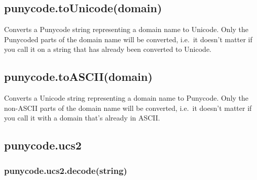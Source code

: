\subsection{punycode.toUnicode(domain)}\label{punycode.tounicodedomain}

Converts a Punycode string representing a domain name to Unicode. Only
the Punycoded parts of the domain name will be converted, i.e.~it
doesn't matter if you call it on a string that has already been
converted to Unicode.

\begin{Shaded}
\begin{Highlighting}[]
\NormalTok{(}\NormalTok{); }
\NormalTok{(}\NormalTok{); }
\end{Highlighting}
\end{Shaded}

\subsection{punycode.toASCII(domain)}\label{punycode.toasciidomain}

Converts a Unicode string representing a domain name to Punycode. Only
the non-ASCII parts of the domain name will be converted, i.e.~it
doesn't matter if you call it with a domain that's already in ASCII.

\begin{Shaded}
\begin{Highlighting}[]
\NormalTok{(}\NormalTok{); }
\NormalTok{(}\NormalTok{); }
\end{Highlighting}
\end{Shaded}

\subsection{punycode.ucs2}\label{punycode.ucs2}

\subsubsection{punycode.ucs2.decode(string)}\label{punycode.ucs2.decodestring}

